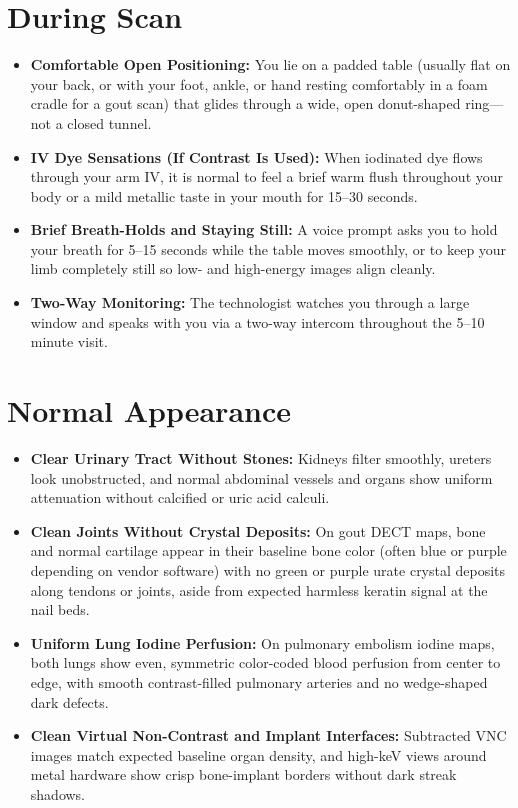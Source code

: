 \section{During Scan}
\begin{itemize}
\item \textbf{Comfortable Open Positioning:} You lie on a padded table (usually flat on your back, or with your foot, ankle, or hand resting comfortably in a foam cradle for a gout scan) that glides through a wide, open donut-shaped ring---not a closed tunnel.
\item \textbf{IV Dye Sensations (If Contrast Is Used):} When iodinated dye flows through your arm IV, it is normal to feel a brief warm flush throughout your body or a mild metallic taste in your mouth for 15--30 seconds.
\item \textbf{Brief Breath-Holds and Staying Still:} A voice prompt asks you to hold your breath for 5--15 seconds while the table moves smoothly, or to keep your limb completely still so low- and high-energy images align cleanly.
\item \textbf{Two-Way Monitoring:} The technologist watches you through a large window and speaks with you via a two-way intercom throughout the 5--10 minute visit.
\end{itemize}

\section{Normal Appearance}
\begin{itemize}
\item \textbf{Clear Urinary Tract Without Stones:} Kidneys filter smoothly, ureters look unobstructed, and normal abdominal vessels and organs show uniform attenuation without calcified or uric acid calculi.
\item \textbf{Clean Joints Without Crystal Deposits:} On gout DECT maps, bone and normal cartilage appear in their baseline bone color (often blue or purple depending on vendor software) with no green or purple urate crystal deposits along tendons or joints, aside from expected harmless keratin signal at the nail beds.
\item \textbf{Uniform Lung Iodine Perfusion:} On pulmonary embolism iodine maps, both lungs show even, symmetric color-coded blood perfusion from center to edge, with smooth contrast-filled pulmonary arteries and no wedge-shaped dark defects.
\item \textbf{Clean Virtual Non-Contrast and Implant Interfaces:} Subtracted VNC images match expected baseline organ density, and high-keV views around metal hardware show crisp bone-implant borders without dark streak shadows.
\end{itemize}

